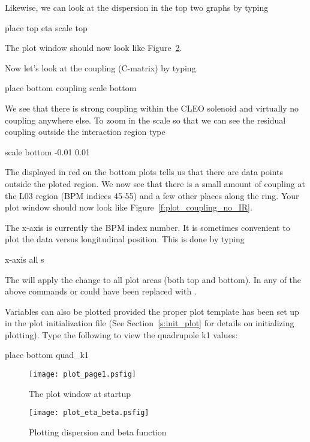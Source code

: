 Likewise, we can look at the dispersion in the top two graphs by typing
\begin{example}
  place top eta
  scale top
\end{example}
The plot window should now look like Figure~\ref{f:plot_eta_beta}.

Now let's look at the coupling (C-matrix) by typing
\begin{example}
  place bottom coupling
  scale bottom
\end{example}
We see that there is strong coupling within the CLEO solenoid and virtually no
coupling anywhere else. To zoom in the scale so that we can see the residual
coupling outside the interaction region type
\begin{example}
  scale bottom -0.01 0.01
\end{example}
The  displayed in red on the bottom plots tells us that there are data
points outside the ploted region.  We now see that there is a small amount of
coupling at the L03 region (BPM indices 45-55) and a few other places along the
ring. Your plot window should now look
like Figure~\ref{f:plot_coupling_no_IR}.

The x-axis is currently the BPM index number. It is sometimes convenient to plot
the data versus longitudinal position. This is done by typing
\begin{example}
  x-axis all s
\end{example}

The  will apply the change to all plot areas (both top and bottom). In
any of the above commands  or  could have been replaced
with .

Variables can also be plotted provided the proper plot template has been set up
in the plot initialization file (See Section~\ref{s:init_plot} for details on
initializing plotting). Type the following to view the quadrupole k1 values:
\begin{example}
  place bottom quad_k1
\end{example}

\begin{figure}
  \centering
  \texttt{[image: plot\_page1.psfig]}
  \caption{The plot window at startup}
  \label{f:plot_begin}
\end{figure}

\begin{figure}
  \centering
  \texttt{[image: plot\_eta\_beta.psfig]}
  \caption{Plotting dispersion and beta function}
  \label{f:plot_eta_beta}
\end{figure}

